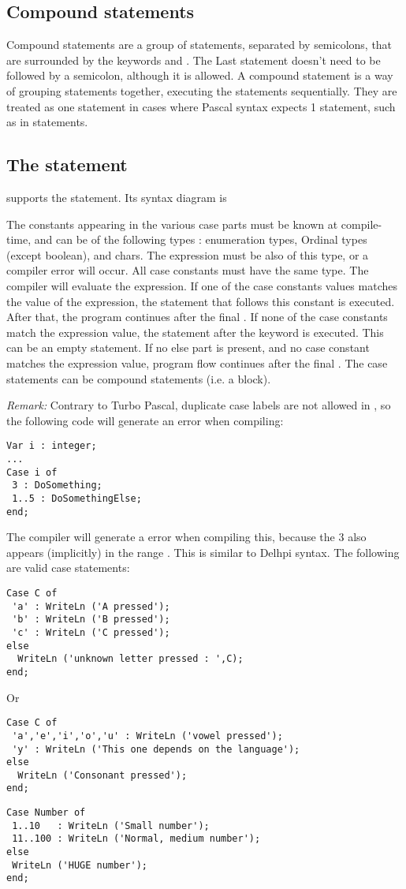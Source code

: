\documentclass{report}
\begin{document}
\subsection{Compound statements}
Compound statements are a group of statements, separated by semicolons,
that are surrounded by the keywords  and . The
Last statement doesn't need to be followed by a semicolon, although it is
allowed. A compound statement is a way of grouping statements together,
executing the statements sequentially. They are treated as one statement
in cases where Pascal syntax expects 1 statement, such as in
 statements.

\subsection{The  statement}
\fpc supports the  statement. Its syntax diagram is

The constants appearing in the various case parts must be known at
compile-time, and can be of the following types : enumeration types,
Ordinal types (except boolean), and chars. The expression must be also of
this type, or a compiler error will occur. All case constants must
have the same type.
The compiler will evaluate the expression. If one of the case constants
values matches the value of the expression, the statement that follows
this constant is executed. After that, the program continues after the final
.
If none of the case constants match the expression value, the statement
after the  keyword is executed. This can be an empty statement.
If no else part is present, and no case constant matches the expression
value, program flow continues after the final .
The case statements can be compound statements
(i.e. a  block).

{\em Remark:} Contrary to Turbo Pascal, duplicate case labels are not
allowed in \fpc, so the following code will generate an error when
compiling:
\begin{verbatim}
Var i : integer;
...
Case i of
 3 : DoSomething;
 1..5 : DoSomethingElse;
end;
\end{verbatim}
The compiler will generate a  error when compiling
this, because the 3 also appears (implicitly) in the range . This
is similar to Delhpi syntax.
The following are valid case statements:
\begin{verbatim}
Case C of
 'a' : WriteLn ('A pressed');
 'b' : WriteLn ('B pressed');
 'c' : WriteLn ('C pressed');
else
  WriteLn ('unknown letter pressed : ',C);
end;
\end{verbatim}
Or
\begin{verbatim}
Case C of
 'a','e','i','o','u' : WriteLn ('vowel pressed');
 'y' : WriteLn ('This one depends on the language');
else
  WriteLn ('Consonant pressed');
end;
\end{verbatim}
\begin{verbatim}
Case Number of
 1..10   : WriteLn ('Small number');
 11..100 : WriteLn ('Normal, medium number');
else
 WriteLn ('HUGE number');
end;
\end{verbatim}
\end{document}
